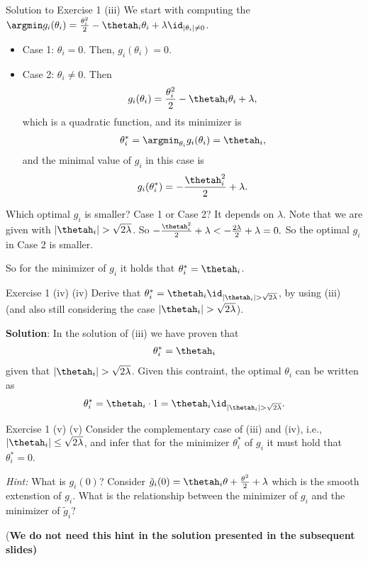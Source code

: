 \documentclass[aspectratio=169]{beamer}
\newcommand{\thetahi}{\thetah_i}
\newcommand{\thetai}{\theta_i}
\newcommand{\thetainnz}{\id_{|\theta_i| \neq 0}}
\begin{document}
\begin{frame}{Solution to Exercise 1 (iii)}
	\small
	We start with computing the $\argmin g_i(\thetai) = \frac{\thetai^2}{2} - \thetahi \thetai + \lambda \thetainnz$.
	\begin{itemize}
		\item Case 1: $\thetai = 0$. Then, $g_i(\thetai) = 0$.
		\item Case 2: $\thetai \neq 0$. Then
			\begin{align*}
				g_i(\theta_i) = \frac{\thetai^2}{2} - \thetahi \thetai + \lambda,
			\end{align*}
			which is a quadratic function, and its minimizer is 
			\begin{align*}
				\thetai^* = \argmin_{\theta_i} g_i(\thetai) = \thetahi,
			\end{align*}
			and the minimal value of $g_i$ in this case is 
			\begin{align*}
				g_i(\thetai^*) = -\frac{\thetahi^2}{2} + \lambda.
			\end{align*}
	\end{itemize}
	Which optimal $g_i$ is smaller? Case 1 or Case 2? It depends on $\lambda$. Note that we are given with $|\thetahi| > \sqrt{2 \lambda}$. So $-\frac{\thetahi^2}{2} + \lambda <  -\frac{2 \lambda}{2} + \lambda = 0.$
	So the optimal $g_i$ in Case 2 is smaller. 
	
	So for the minimizer of $g_i$ it holds that $\thetai^* = \thetah_i$.
\end{frame}

\begin{frame}{Exercise 1 (iv)}
	(iv) Derive that $\thetai^* = \thetahi \id_{|\thetahi| > \sqrt{2\lambda}}$, by using (iii) (and also still considering the case $|\thetahi| > \sqrt{2\lambda}$).
	
	\textbf{Solution}: In the solution of (iii) we have proven that 
	\begin{align*}
		\thetai^* = \thetahi 
	\end{align*}
	given that $|\thetahi| > \sqrt{2 \lambda}$. Given this contraint, the optimal $\thetai$ can be written as 
	\begin{align*}
		\thetai^* = \thetahi \cdot 1 = \thetahi \id_{|\thetahi| > \sqrt{2\lambda}}.
	\end{align*}
\end{frame}

\begin{frame}{Exercise 1 (v)}
	(v) Consider the complementary case of (iii) and (iv), i.e., $|\thetahi| \leq \sqrt{2\lambda}$, and infer that for the minimizer $\thetai^*$ of $g_i$ it must hold that $\thetai^* = 0$.
	
	\emph{Hint: } What is $g_i(0)$? Consider $\tilde{g}_i(0) = \thetahi \theta + \frac{\theta^2}{2} + \lambda$ which is the smooth extenstion of $g_i$. What is the relationship between the minimizer of $g_i$ and the minimizer of $\tilde{g}_i$? 
	
	(\textbf{We do not need this hint in the solution presented in the subsequent slides)}
\end{frame}
\end{document}
